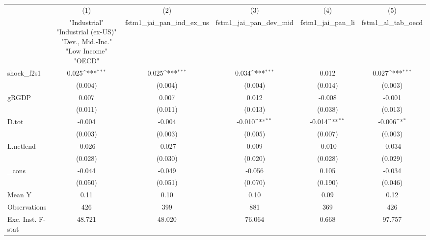 {
\def\sym#1{\ifmmode^{#1}\else\(^{#1}\)\fi}
\begin{tabular}{l*{5}{c}}
\toprule
            &\multicolumn{1}{c}{(1)}&\multicolumn{1}{c}{(2)}&\multicolumn{1}{c}{(3)}&\multicolumn{1}{c}{(4)}&\multicolumn{1}{c}{(5)}\\
            &\multicolumn{1}{c}{ "Industrial" "Industrial (ex-US)" "Dev., Mid.-Inc." "Low Income" "OECD" }&\multicolumn{1}{c}{fstm1\_jai\_pan\_ind\_ex\_us}&\multicolumn{1}{c}{fstm1\_jai\_pan\_dev\_mid}&\multicolumn{1}{c}{fstm1\_jai\_pan\_li}&\multicolumn{1}{c}{fstm1\_al\_tab\_oecd}\\
\midrule
shock\_f2s1  &       0.025\sym{***}&       0.025\sym{***}&       0.034\sym{***}&       0.012         &       0.027\sym{***}\\
            &     (0.004)         &     (0.004)         &     (0.004)         &     (0.014)         &     (0.003)         \\
\addlinespace
gRGDP       &       0.007         &       0.007         &       0.012         &      -0.008         &      -0.001         \\
            &     (0.011)         &     (0.011)         &     (0.013)         &     (0.038)         &     (0.013)         \\
\addlinespace
D.tot       &      -0.004         &      -0.004         &      -0.010\sym{**} &      -0.014\sym{**} &      -0.006\sym{*}  \\
            &     (0.003)         &     (0.003)         &     (0.005)         &     (0.007)         &     (0.003)         \\
\addlinespace
L.netlend   &      -0.026         &      -0.027         &       0.009         &      -0.010         &      -0.034         \\
            &     (0.028)         &     (0.030)         &     (0.020)         &     (0.028)         &     (0.029)         \\
\addlinespace
\_cons      &      -0.044         &      -0.049         &      -0.056         &       0.105         &      -0.034         \\
            &     (0.050)         &     (0.051)         &     (0.070)         &     (0.190)         &     (0.046)         \\
\midrule
Mean Y      &        0.11         &        0.10         &        0.10         &        0.09         &        0.12         \\
Observations&         426         &         399         &         881         &         369         &         426         \\
Exc. Inst. F-stat&      48.721         &      48.020         &      76.064         &       0.668         &      97.757         \\
\bottomrule
\end{tabular}
}
